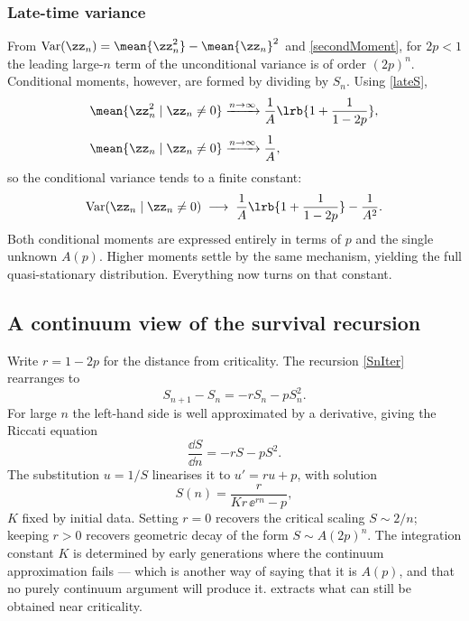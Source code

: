 \subsubsection{Late-time variance}

From \(\mathrm{Var}(\zz_n)=\mean{\zz_n^2}-\mean{\zz_n}^2\) and \cref{secondMoment}, for \(2p<1\) the leading large-\(n\) term of the unconditional variance is of order \((2p)^n\). Conditional moments, however, are formed by dividing by \(S_n\). Using \cref{lateS},
\begin{align*}
\mean{\zz_n^2\mid \zz_n\neq0} &\xrightarrow{n\to\infty}
\frac{1}{A}\lrb{1+\frac{1}{1-2p}},\\[4pt]
\mean{\zz_n\mid \zz_n\neq0} &\xrightarrow{n\to\infty}
\frac{1}{A},
\end{align*}
so the conditional variance tends to a finite constant:
\begin{equation}
\label{eq:condvar}
\mathrm{Var}(\zz_n\mid \zz_n\neq0) \;\longrightarrow\; \frac{1}{A}\lrb{1+\frac{1}{1-2p}} - \frac{1}{A^2}.
\end{equation}
Both conditional moments are expressed entirely in terms of \(p\) and the single unknown \(A(p)\). Higher moments settle by the same mechanism, yielding the full quasi-stationary distribution. Everything now turns on that constant.

\subsection{A continuum view of the survival recursion}
\label{sec:riccati}

Write \(r=1-2p\) for the distance from criticality. The recursion \cref{SnIter} rearranges to
\begin{equation}
\label{eq:Sdiff}
S_{n+1}-S_n = -r S_n - p S_n^2 .
\end{equation}
For large \(n\) the left-hand side is well approximated by a derivative, giving the Riccati equation
\begin{equation}
\label{eq:riccati}
\frac{\dd S}{\dd n} = -r S - p S^2 .
\end{equation}
The substitution \(u=1/S\) linearises it to \(u'=ru+p\), with solution
\begin{equation}
\label{eq:riccatisol}
S(n) = \frac{r}{K r\,\ee^{rn} - p},
\end{equation}
\(K\) fixed by initial data. Setting \(r=0\) recovers the critical scaling \(S\sim2/n\); keeping \(r>0\) recovers geometric decay of the form \(S\sim A(2p)^n\). The integration constant \(K\) is determined by early generations where the continuum approximation fails --- which is another way of saying that it is \(A(p)\), and that no purely continuum argument will produce it.  extracts what can still be obtained near criticality.

\FloatBarrier
